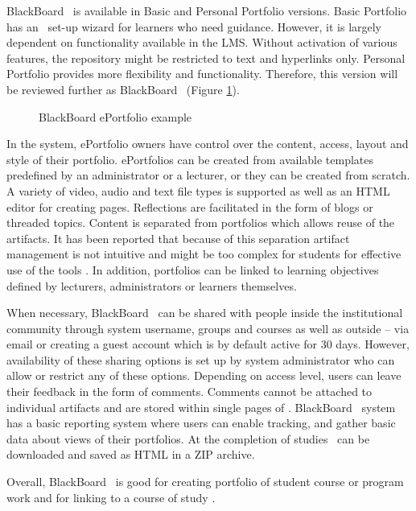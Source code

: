 BlackBoard \ep~is available in Basic and Personal Portfolio versions. Basic
Portfolio has an \ep~set-up wizard for learners who need guidance. However, it
is largely dependent on functionality available in the LMS. Without activation
of various features, the repository might be restricted to text and hyperlinks
only. Personal Portfolio provides more flexibility and functionality. Therefore,
this version will be reviewed further as BlackBoard \ep~(Figure \ref{fig:bbep}).

\begin{figure}[htb]
\centering 
\setlength\fboxsep{0pt}
\setlength\fboxrule{0.5pt}
\fbox{\texttt{[image: CH4-F6-BB]}}
\caption[BlackBoard ePortfolio example]{BlackBoard ePortfolio example
\citep{UniversityofTorontoScarborough2010}}
\label{fig:bbep}
\end{figure}

In the system, ePortfolio owners have control over the content, access, layout
and style of their portfolio. ePortfolios can be created from available
templates predefined by an administrator or a lecturer, or they can be created
from scratch. A variety of video, audio and text file types is supported as well
as an HTML editor for creating pages. Reflections are facilitated in the form of
blogs or threaded topics. Content is separated from portfolios which allows
reuse of the artifacts. It has been reported that because of this separation
artifact management is not intuitive and might be too complex for students for
effective use of the tools \citep{Clark2009}. In addition, portfolios can be
linked to learning objectives defined by lecturers, administrators or learners
themselves.

When necessary, BlackBoard \ep~can be shared with people inside the
institutional community through system username, groups and courses as well as
outside -- via email or creating a guest account which is by default active for
30 days. However, availability of these sharing options is set up by system
administrator who can allow or restrict any of these options. Depending on
access level, users can leave their feedback in the form of comments. Comments
cannot be attached to individual artifacts and are stored within single pages of
\ep. BlackBoard \ep~system has a basic reporting system where users can enable
tracking, and gather basic data about views of their portfolios. At the
completion of studies \ep~can be downloaded and saved as HTML in a ZIP archive.

Overall, BlackBoard \ep~is good for creating portfolio of student course or
program work and for linking to a course of study
\citep{UniversityofTorontoScarborough2010}. 

